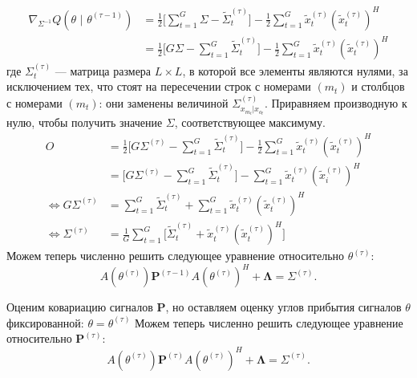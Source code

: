 \documentclass[11pt]{article}
\begin{document}
\begin{align*}
\nabla_{\Sigma^{-1}} Q(\theta \text{ | } \theta^{(\tau-1)}) &= \frac{1}{2} \big[ \sum_{t = 1}^{G} \Sigma -  \widetilde{\Sigma}_{t}^{(\tau)} \big] - \frac{1}{2} \sum_{t = 1}^{G} \widetilde{x}_t^{(\tau)}(\widetilde{x}_t^{(\tau)})^H \\
&= \frac{1}{2} \big[ G \Sigma - \sum_{t = 1}^{G} \widetilde{\Sigma}_{t}^{(\tau)} \big] - \frac{1}{2} \sum_{t = 1}^{G} \widetilde{x}_t^{(\tau)}(\widetilde{x}_t^{(\tau)})^H
\end{align*}
где $\Sigma_{t}^{(\tau)}$ --- матрица размера $L \times L$, в которой все элементы являются нулями, за исключением тех, что стоят на пересечении строк с номерами $(m_t)$ и столбцов с номерами $(m_t)$: они заменены величиной $\Sigma^{(\tau)}_{x_{m_t}|x_{o_t}}$.
Приравняем производную к нулю, чтобы получить значение $\Sigma$, соответствующее максимуму.
\begin{align*}
O &= \frac{1}{2} \big[ G \Sigma^{(\tau)} - \sum_{t = 1}^{G} \widetilde{\Sigma}_{t}^{(\tau)} \big] - \frac{1}{2} \sum_{t = 1}^{G} \widetilde{x}_t^{(\tau)}(\widetilde{x}_t^{(\tau)})^H \\
&= \big[ G \Sigma^{(\tau)} - \sum_{t = 1}^{G} \widetilde{\Sigma}_{t}^{(\tau)} \big] - \sum_{t = 1}^{G} \widetilde{x}_t^{(\tau)}(\widetilde{x}_i^{(\tau)})^H \\
\iff G \Sigma^{(\tau)} &= \sum_{t = 1}^{G} \widetilde{\Sigma}_{t}^{(\tau)} + \sum_{t = 1}^{G} \widetilde{x}_t^{(\tau)}(\widetilde{x}_t^{(\tau)})^H \\
\iff \Sigma^{(\tau)} &= \frac{1}{G} \sum_{t = 1}^{G} \Big[ \widetilde{\Sigma}_{t}^{(\tau)} + \widetilde{x}_t^{(\tau)}(\widetilde{x}_t^{(\tau)})^H \Big]
\end{align*}
Можем теперь численно решить следующее уравнение относительно $\theta^{(\tau)}$:
\begin{equation}
A(\theta^{(\tau)})\mathbf{P}^{(\tau-1)}A(\theta^{(\tau)})^H + \mathbf{\Lambda} = \Sigma^{(\tau)}.
\end{equation}
\begin{center}
\fontsize{14}{18}\selectfont {}
\end{center}
Оценим ковариацию сигналов $\mathbf{P}$, но оставляем оценку углов прибытия сигналов $\theta$ фиксированной: $\theta = \theta^{(\tau)}$
Можем теперь численно решить следующее уравнение относительно $\mathbf{P}^{(\tau)}$:
\begin{equation}
A(\theta^{(\tau)})\mathbf{P}^{(\tau)}A(\theta^{(\tau)})^H + \mathbf{\Lambda} = \Sigma^{(\tau)}.
\end{equation}
\end{document}
